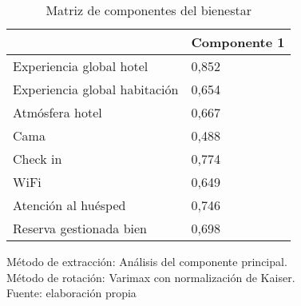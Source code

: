 \begin{table}[h]
    \caption {Matriz de componentes del bienestar}
	\label{tab:componentesB}
	\setlength\extrarowheight{5pt}
	
	\begin{tabular}{p{8.0cm} p{4.3cm}}
	\toprule
		& Componente 1 \\
	\midrule
	Experiencia global hotel & 0,852 \\
	Experiencia global habitación & 0,654 \\
	Atmósfera hotel & 0,667 \\
	Cama & 0,488 \\
	Check in & 0,774 \\
	WiFi & 0,649 \\
	Atención al huésped & 0,746 \\
	Reserva gestionada bien & 0,698 \\
	\bottomrule
	\end{tabular}
	
	\center
	\footnotesize
	Método de extracción: Análisis del componente principal.\\
	Método de rotación: Varimax con normalización de Kaiser.\\
	Fuente: elaboración propia
\end{table}
